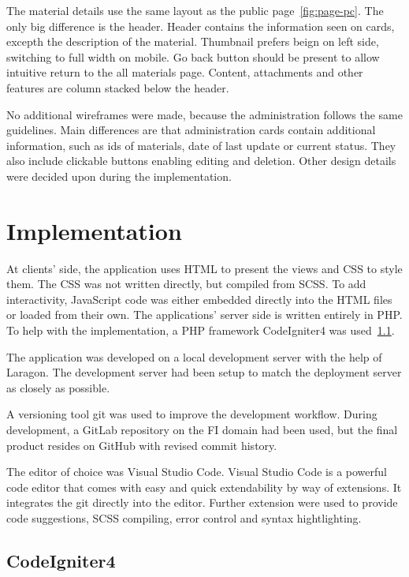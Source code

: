 \documentclass[
  digital,     %
  oneside,     %
  nosansbold,  %
  colorbold, %
  lof,         %
  lot,         %
]{fithesis4}
\begin{document}
The material details use the same layout as the public page~\ref{fig:page-pc}. The only big difference is the header. Header contains the information seen on cards, excepth the description of the material. Thumbnail prefers beign on left side, switching to full width on mobile. Go back button should be present to allow intuitive return to the all materials page. Content, attachments and other features are column stacked below the header.

No additional wireframes were made, because the administration follows the same guidelines. Main differences are that administration cards contain additional information, such as ids of materials, date of last update or current status.  They also include clickable buttons enabling editing and deletion. Other design details were decided upon during the implementation.

\chapter{Implementation}

At clients' side, the application uses HTML to present the views and CSS to style them. The CSS was not written directly, but compiled from SCSS. To add interactivity, JavaScript code was either embedded directly into the HTML files or loaded from their own. The applications' server side is written entirely in PHP. To help with the implementation, a PHP framework CodeIgniter4 was used~\ref{sect:codeigniter}.

The application was developed on a local development server with the help of Laragon. The development server had been setup to match the deployment server as closely as possible.

A versioning tool git was used to improve the development workflow. During development, a GitLab repository on the FI domain had been used, but the final product resides on GitHub with revised commit history.

The editor of choice was Visual Studio Code. Visual Studio Code is a powerful code editor that comes with easy and quick extendability by way of extensions. It integrates the git directly into the editor. Further extension were used to provide code suggestions, SCSS compiling, error control and syntax hightlighting.

\section{CodeIgniter4}
\label{sect:codeigniter}
\end{document}
